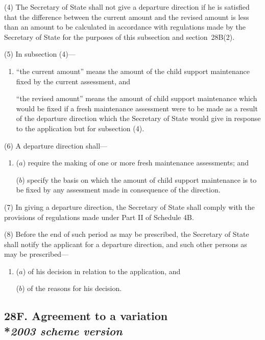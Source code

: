 \documentclass[12pt,a4paper]{article}
\begin{document}
(4) The Secretary of State shall not give a departure direction if he is satisfied that the difference between the current amount and the revised amount is less than an amount to be calculated in accordance with regulations made by the Secretary of State for the purposes of this subsection and section~28B(2).

(5) In subsection (4)—
\begin{enumerate}\item[]
    “the current amount” means the amount of the child support maintenance fixed by the current assessment, and

    “the revised amount” means the amount of child support maintenance which would be fixed if a fresh maintenance assessment were to be made as a result of the departure direction which the Secretary of State would give in response to the application but for subsection (4). 
\end{enumerate}

(6) A departure direction shall—
\begin{enumerate}\item[]
($a$) require 
the making of  %
one or more fresh maintenance assessments; and

($b$) specify the basis on which the amount of child support maintenance is to be fixed by any assessment made in consequence of the direction.
\end{enumerate}

(7) In giving a departure direction, the Secretary of State shall comply with the provisions of regulations made under Part II of Schedule 4B.

(8) Before the end of such period as may be prescribed, the Secretary of State shall notify the applicant for a departure direction, and such other persons as may be prescribed—
\begin{enumerate}\item[]
($a$) of his decision in relation to the application, and

($b$) of the reasons for his decision.
\end{enumerate}


\subsection[28F. Agreement to a variation --- \emph{2003 scheme version}]{28F. Agreement to a variation\\*\emph{2003 scheme version}}
\end{document}
